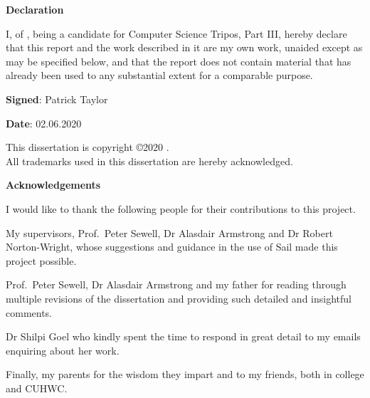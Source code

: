\newpage
{\Huge \bf Declaration}

\vspace{24pt} 

I, \authorname of \authorcollege , being a candidate for Computer Science Tripos, Part III, hereby declare that this report and the work described in it are my own work, unaided except as may be specified below, and that the report does not contain material that has already been used to any substantial extent for a comparable purpose.

\vspace{60pt}
\textbf{Signed}: Patrick Taylor

\vspace{12pt}
\textbf{Date}: 02.06.2020


\vfill

This dissertation is copyright \copyright 2020 \authorname. 
\\
All trademarks used in this dissertation are hereby acknowledged.

\newpage

{\Huge \bf Acknowledgements}

\vspace{24pt}

I would like to thank the following people for their contributions to this project.

My supervisors, Prof.~Peter Sewell, Dr Alasdair Armstrong and Dr Robert Norton-Wright, whose suggestions and guidance in the use of Sail made this project possible.

Prof.~Peter Sewell, Dr Alasdair Armstrong and my father for reading through multiple revisions of the dissertation and providing such detailed and insightful comments.

Dr Shilpi Goel who kindly spent the time to respond in great detail to my emails enquiring about her work.

Finally, my parents for the wisdom they impart and to my friends, both in college and CUHWC.

\vspace*{\fill}
